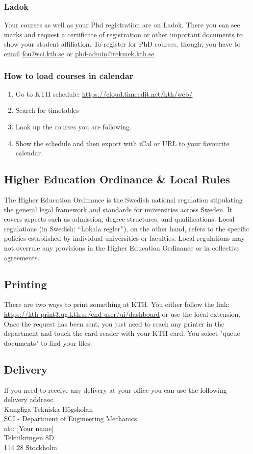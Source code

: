 \documentclass{article}
\begin{document}
\subsubsection{Ladok}
Your courses as well as your Phd registration are on Ladok. There you can see marks and request a certificate of registration or other important documents to show your student affiliation.
To register for PhD courses, though, you have to email \url{fou@sci.kth.se} or \url{phd-admin@tekmek.kth.se}.

\subsubsection{How to load courses in calendar}
\begin{enumerate}
    \item Go to KTH schedule: \url{https://cloud.timeedit.net/kth/web/}
    \item Search for timetables
    \item Look up the courses you are following.
    \item Show the schedule and then export with iCal or URL to your favourite calendar.
\end{enumerate}

\subsection{Higher Education Ordinance \& Local Rules}
The Higher Education Ordinance is the Swedish national regulation stipulating the general legal framework and standards for universities across Sweden. It covers aspects such as admission, degree structures, and qualifications. Local regulations (in Swedish: “Lokala regler”), on the other hand, refers to the specific policies established by individual universities or faculties. Local regulations may not overrule any provisions in the Higher Education Ordinance or in collective agreements.

\subsection{Printing}
There are two ways to print something at KTH. You either follow the link: \url{https://kth-print3.ug.kth.se/end-user/ui/dashboard} or use the local extension. Once the request has been sent, you just need to reach any printer in the department and touch the card reader with your KTH card. You select "queue documents" to find your files.

\subsection{Delivery}
If you need to receive any delivery at your office you can use the following delivery address:\\
Kungliga Tekniska Högskolan\\
SCI - Department of Engineering Mechanics\\
att: [Your name]\\
Teknikringen 8D\\
114 28 Stockholm\\
\end{document}
